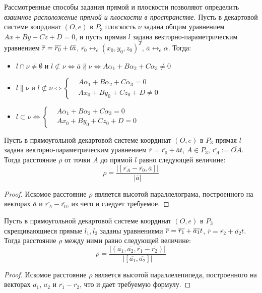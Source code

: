 \begin{note}
	Рассмотренные способы задания прямой и плоскости позволяют определить \textit{взаимное расположение прямой и плоскости в пространстве}. Пусть в декартовой системе координат $(O, e)$ в $P_3$ плоскость $\nu$ задана общим уравнением $Ax + By + Cz + D = 0$, и пусть прямая $l$ задана векторно-параметрическим уравнением $\overline{r} \hm{=} \overline{r_0} + t\overline{a}$, $\overline{r_0} \leftrightarrow_{e} (x_0, y_0, z_0)^T$, $\overline{a} \leftrightarrow_{e} \alpha$. Тогда:
	\begin{itemize}
		\item $l \cap \nu \ne \emptyset \text{ и }  l \not\subset \nu \Leftrightarrow \overline{a} \nparallel \nu \Leftrightarrow A\alpha_1 + B\alpha_2 + C\alpha_3 \ne 0$
		\item $l \parallel \nu \text{ и } l \not\subset \nu \Leftrightarrow
		\left\{\begin{aligned}
		&A\alpha_1 + B\alpha_2 + C\alpha_3 = 0\\
		&Ax_0 + By_0 + Cz_0 + D \ne 0
		\end{aligned}\right.$
		\item $l \subset \nu \Leftrightarrow
		\left\{\begin{aligned}
		&A\alpha_1 + B\alpha_2 + C\alpha_3 = 0\\
		&Ax_0 + By_0 + Cz_0 + D = 0
		\end{aligned}\right.$
	\end{itemize}
\end{note}

\begin{proposition}
	Пусть в прямоугольной декартовой системе координат $(O, e)$ в $P_3$ прямая $l$ задана  векторно-параметрическим уравнением $\overline{r} = \overline{r_0} + \overline{a}t$, $A \in P_3$, $\overline{r_A} := \overline{OA}$. Тогда расстояние $\rho$ от точки $A$ до прямой $l$ равно следующей величине:
	\[\rho = \frac{|[\overline{r_A} - \overline{r_0}, \overline{a}]|}{|\overline{a}|}\]
\end{proposition}

\begin{proof}
	Искомое расстояние $\rho$ является высотой параллелограма, построенного на векторах $\overline a$ и $\overline{r_A} - \overline{r_0}$, из чего и следует требуемое.
\end{proof}

\begin{proposition}
	Пусть в прямоугольной декартовой системе координат $(O, e)$ в $P_3$ скрещивающиеся прямые $l_1, l_2$ заданы уравнениями $\overline{r} = \overline{r_1} \hm{+} \overline{a_1}t$, $\overline{r} = \overline{r_2} + \overline{a_2}t$. Тогда расстояние $\rho$ между ними равно следующей величине:
	\[\rho = \frac{|(\overline{a_1}, \overline{a_2}, \overline{r_1} - \overline{r_2})|}{|[\overline{a_1}, \overline{a_2}]|}\]
\end{proposition}

\begin{proof}
	Искомое расстояние $\rho$ является высотой параллелепипеда, построенного на векторах $\overline{a_1}$, $\overline{a_2}$ и $\overline{r_1} - \overline{r_2}$, что и дает требуемую формулу.
\end{proof}